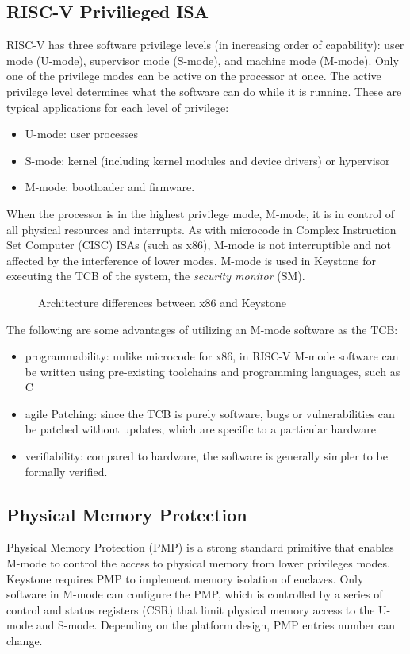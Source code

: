 \subsection{RISC-V Privilieged ISA}
RISC-V \cite{risc-v-spec} has three software privilege levels (in increasing order of capability): user mode (U-mode), supervisor mode (S-mode), and machine mode (M-mode). Only one of the privilege modes can be active on the processor at once.
The active privilege level determines what the software can do while it is running. These are typical applications for each level of privilege:
\begin{itemize}
    \item U-mode: user processes 
    \item S-mode: kernel (including kernel modules and device drivers) or hypervisor
    \item M-mode: bootloader and firmware.
\end{itemize}
When the processor is in the highest privilege mode, M-mode, it is in control of all physical resources and interrupts. As with microcode in Complex Instruction Set Computer (CISC) ISAs (such as x86), M-mode is not interruptible and not affected by the interference of lower modes. M-mode is used in Keystone for executing the TCB of the system, the \textit{security monitor} (SM).
\begin{figure}[H]
    \centering
    
    \caption{Architecture differences between x86 and Keystone}
    \label{keystone-vs-x86}
\end{figure}

The following are some advantages of utilizing an M-mode software as the TCB:
\begin{itemize}
    \item programmability: unlike microcode for x86, in RISC-V M-mode software can be written using pre-existing toolchains and programming languages, such as C 
    \item agile Patching: since the TCB is purely software, bugs or vulnerabilities can be patched without updates, which are specific to a particular hardware 
    \item verifiability: compared to hardware, the software is generally simpler to be formally verified.
\end{itemize}

\subsection{Physical Memory Protection}
Physical Memory Protection (PMP) \cite{pmp-sifive} is a strong standard primitive that enables M-mode to control the access to physical memory from lower privileges modes. Keystone requires PMP to implement memory isolation of enclaves.
Only software in M-mode can configure the PMP, which is controlled by a series of control and status registers (CSR) that limit physical memory access to the U-mode and S-mode. Depending on the platform design, PMP entries number can change. 

